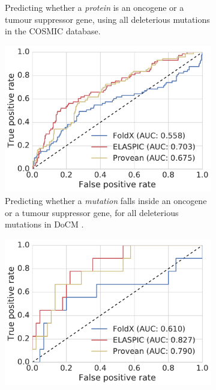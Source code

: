 \begin{figure}[tb]
\begin{subfigure}[t]{0.48\textwidth}
		\caption{
			Predicting whether a \textit{protein} is an oncogene or a tumour suppressor gene, using all deleterious mutations in the COSMIC database.
		}
		\label{fig:validation_cancer_bygene_full}
		\vspace*{10mm}
	\end{subfigure}

	\begin{subfigure}[t]{0.48\textwidth}
		\centering
		\includegraphics[width=1\linewidth]{static/elaspic_training_set/validation_cancer/roc_curve_high_confidence.pdf}
		\caption{
			Predicting whether a \textit{mutation} falls inside an oncogene or a tumour suppressor gene, for all deleterious mutations in DoCM \cite{griffith_civic:_2016}.
		}
		\label{fig:validation_cancer_high_confidence}
		\vspace*{5mm}
	\end{subfigure}%
	\hspace*{5mm}
	\begin{subfigure}[t]{0.48\textwidth}
		\centering
		\includegraphics[width=1\linewidth]{static/elaspic_training_set/validation_cancer/roc_curve_bygene_high_confidence.pdf}

\end{subfigure}
\end{figure}
